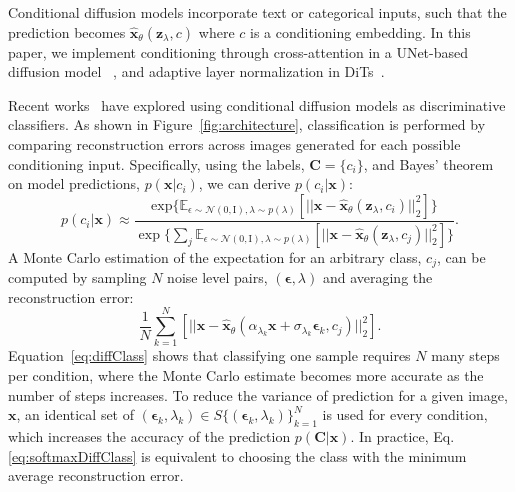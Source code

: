 Conditional diffusion models incorporate text or categorical inputs, such that the prediction becomes $\hat{\bm{x}}_\theta(\bm{z}_\lambda, c)$ where $c$ is a conditioning embedding. In this paper, we implement conditioning through cross-attention in a UNet-based diffusion model ~\cite{rombach2022highresolutionimagesynthesislatent}, and adaptive layer normalization in DiTs~\cite{peebles2023scalablediffusionmodelstransformers}. 

Recent works~\cite{Li:arXiv:2023:diffusionClassifier, clark2023texttoimagediffusionmodelszeroshot, Krojer:arXiv:2023:DiffusionReasoners, chen2024robustclassificationsinglediffusion} have explored using conditional diffusion models as discriminative classifiers. As shown in Figure~\ref{fig:architecture}, classification is performed by comparing reconstruction errors across images generated for each possible conditioning input. Specifically, using the labels, $\bm{C}=\{c_i\}$, and Bayes' theorem on model predictions, $p(\bm{x}|c_i)$, we can derive $p(c_i|\bm{x})$:
\begin{equation}
    p(c_i|\bm{x}) \approx \frac{\text{exp} \{\mathbb{E}_{\epsilon \sim \mathcal{N}(0,\text{I}), \lambda \sim p(\lambda)} \left[ ||\bm{x} - \hat{\bm{x}}_\theta(\bm{z}_\lambda, c_i)||_2^2 \right]\}}{\exp \{\sum_j\mathbb{E}_{\epsilon \sim \mathcal{N}(0,\text{I}), \lambda \sim p(\lambda)} \left[ ||\bm{x} - \hat{\bm{x}}_\theta(\bm{z}_\lambda, c_j)||_2^2 \right]\}}. \label{eq:softmaxDiffClass}
\end{equation}
A Monte Carlo estimation of the expectation for an arbitrary class, $c_j$, can be computed by sampling $N$ noise level pairs, $(\bm{\epsilon}, \lambda)$ and averaging the reconstruction error:
\begin{equation}
    \frac{1}{N}\sum^N_{k=1} \left[ ||\bm{x} - \hat{\bm{x}}_\theta(\alpha_{\lambda_k} \bm{x} + \sigma_{\lambda_k} \bm{\epsilon}_k, c_j)||_2^2 \right].\label{eq:diffClass}
\end{equation}
Equation~\ref{eq:diffClass} shows that classifying one sample requires $N$ many steps per condition, where the Monte Carlo estimate becomes more accurate as the number of steps increases. To reduce the variance of prediction for a given image, $\bm{x}$, an identical set of $(\bm{\epsilon}_k, \lambda_k) \in S\{(\bm{\epsilon}_k, \lambda_k)\}_{k=1}^N$ is used for every condition, which increases the accuracy of the prediction $p(\bm{C}|\bm{x})$. In practice, Eq. \ref{eq:softmaxDiffClass} is equivalent to choosing the class with the minimum average reconstruction error. %

